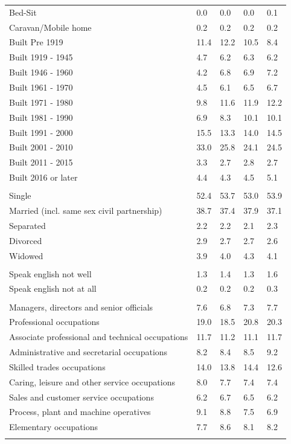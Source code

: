 \documentclass{article}
\begin{document}
\begin{table}[h]
\begin{tabular}{KTTTT}
Bed-Sit & 0.0& 0.0& 0.0& 0.1\\
Caravan/Mobile home & 0.2& 0.2& 0.2& 0.2\\
    \hline
Built Pre 1919 & 11.4& 12.2& 10.5&  8.4\\
Built 1919 - 1945 & 4.7& 6.2& 6.3& 6.2\\
Built  1946 - 1960 & 4.2& 6.8& 6.9& 7.2\\
Built  1961 - 1970 & 4.5& 6.1& 6.5& 6.7\\
Built  1971 - 1980 &  9.8& 11.6& 11.9& 12.2\\
Built  1981 - 1990 &  6.9&  8.3& 10.1& 10.1\\
Built  1991 - 2000 & 15.5& 13.3& 14.0& 14.5\\
Built  2001 - 2010 & 33.0& 25.8& 24.1& 24.5\\
Built  2011 - 2015 & 3.3& 2.7& 2.8& 2.7\\
Built  2016 or later & 4.4& 4.3& 4.5& 5.1\\
\hline
    \\
    \hline
Single & 52.4& 53.7& 53.0& 53.9\\
Married (incl. same sex civil partnership) & 38.7& 37.4& 37.9& 37.1\\
Separated  & 2.2& 2.2& 2.1& 2.3\\
Divorced  & 2.9& 2.7& 2.7& 2.6\\
Widowed & 3.9& 4.0& 4.3& 4.1\\
\hline
    \\ 
    \hline
Speak english not well & 1.3& 1.4& 1.3& 1.6\\
Speak english not at all & 0.2& 0.2& 0.2& 0.3\\
\hline
    \\
    \hline
Managers, directors and senior officials & 7.6& 6.8& 7.3& 7.7\\
Professional occupations & 19.0& 18.5& 20.8& 20.3\\
Associate professional and technical occupations & 11.7& 11.2& 11.1& 11.7\\
Administrative and secretarial occupations & 8.2& 8.4& 8.5& 9.2\\
Skilled trades occupations & 14.0& 13.8& 14.4& 12.6\\
Caring, leisure and other service occupations & 8.0& 7.7& 7.4& 7.4\\
Sales and customer service occupations & 6.2& 6.7& 6.5& 6.2\\
Process, plant and machine operatives & 9.1& 8.8& 7.5& 6.9\\
Elementary occupations & 7.7& 8.6& 8.1& 8.2\\
\hline
\end{tabular}
\end{table}
\end{document}
